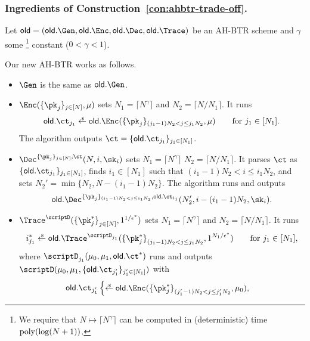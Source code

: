 \subsubsection{Ingredients of Construction~\ref{con:ahbtr-trade-off}.}
Let ${\OLD=(\OLD.\Gen,\OLD.\Enc,\OLD.\Dec,\OLD.\Trace)}$ be an AH-BTR scheme and
$\gamma$ some%
\footnote{We require that ${N\mapsto\lceil N^\gamma\rceil}$ can be computed in (deterministic) time ${\operatorname{poly}(\log(N+1))}$.}
constant (${0<\gamma<1}$).

\begin{construction}\label{con:ahbtr-trade-off}
Our new AH-BTR works as follows.
\begin{itemize}
\item $\Gen$ is the same as $\OLD.\Gen$.
\item $\Enc(\{\pk_j\}_{j\in[N]},\mu)$ sets
${N_1=\lceil N^\gamma\rceil}$ and
${N_2=\lceil N/N_1\rceil}$.
It runs
\begin{align*}
\OLD.\ct_{j_1}\draws\OLD.\Enc(\{\pk_j\}_{(j_1-1)N_2<j\leq j_1N_2},\mu)
\qquad\textup{for }j_1\in[N_1].
\end{align*}
The algorithm outputs ${\ct=\{\OLD.\ct_{j_1}\}_{j_1\in[N_1]}}$.
\item $\Dec^{\{\pk_j\}_{j\in[N]},\ct}(N,i,\sk_i)$ sets
${N_1=\lceil N^\gamma\rceil}$
${N_2=\lceil N/N_1\rceil}$.
It parses $\ct$ as $\{\OLD.\ct_{j_1}\}_{j_1\in[N_1]}$,
finds ${i_1\in[N_1]}$ such that ${(i_1-1)N_2<i\leq i_1N_2}$, and
sets ${N_2'=\min{\{N_2,N-(i_1-1)N_2\}}}$.
The algorithm runs and outputs
\begin{align*}
\OLD.\Dec^{\{\pk_j\}_{(i_1-1)N_2<j\leq i_1N_2},\OLD.\ct_{i_1}}
(N_2',i-(i_1-1)N_2,\sk_i).
\end{align*}
\item $\Trace^\scriptD(\{\pk^\ast_j\}_{j\in[N]}^\sphantom,1^{1/\epsilon^\ast})$ sets
${N_1=\lceil N^\gamma\rceil}$ and
${N_2=\lceil N/N_1\rceil}$.
It runs
\begin{align*}
i^\ast_{j_1}\draws\OLD.\Trace^{\scriptD_{j_1}}(\{\pk^\ast_j\}_{(j_1-1)N_2<j\leq j_1N_2}^\sphantom,1^{N_1/\epsilon^\ast})
\qquad\textup{for }j_1\in[N_1],
\end{align*}
where
$\scriptD_{j_1}(\mu_0,\mu_1,\OLD.\ct^\ast)$
runs and outputs
$\scriptD(\mu_0,\mu_1,\{\OLD.\ct_{j_1'}\}_{j_1'\in[N_1]})$
with
\begin{align*}
\OLD.\ct_{j_1'}\begin{cases}
\draws\OLD.\Enc(\smash{\{\pk^\ast_j\}_{(j_1'-1)N_2<j\leq j_1'N_2}^\sphantom},\mu_0),&

\end{cases}
\end{align*}
\end{itemize}
\end{construction}
